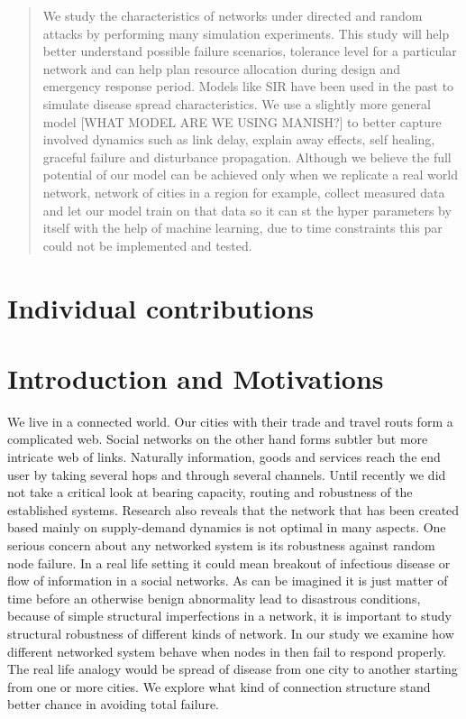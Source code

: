 \documentclass[11pt]{article}
\begin{document}

\tableofcontents

\newpage


\begin{abstract}
		We study the characteristics of networks under directed and random attacks by performing many simulation experiments. This study will help better understand possible failure scenarios, tolerance level for a particular network and can help plan resource allocation during design and emergency response period. Models like SIR have been used in the past to simulate disease spread characteristics. We use a slightly more general model [WHAT MODEL ARE WE USING MANISH?] to better capture involved dynamics such as link delay, explain away effects, self healing, graceful failure and disturbance propagation. Although we believe the full potential of our model can be achieved only when we replicate a real world network, network of cities in a region for example, collect measured data and let our model train on that data so it can st the hyper parameters by itself with the help of machine learning, due to time constraints this par could not be implemented and tested.
\end{abstract}
\clearpage

\section{Individual contributions}

\section{Introduction and Motivations}
   We live in a connected world. Our cities with their trade and travel routs form a complicated web. Social networks on the other hand forms subtler but more intricate web of links. Naturally information, goods and services reach the end user by taking several hops and through several channels. Until recently we did not take a critical look at bearing capacity, routing and robustness of the established systems. Research also reveals that the network that has been created based mainly on supply-demand dynamics is not optimal in many aspects. One serious concern about any networked system is its robustness against random node failure. In a real life setting it could mean breakout of infectious disease or flow of information in a social networks. As can be imagined it is just matter of time before an otherwise benign abnormality lead to disastrous conditions, because of simple structural imperfections in a network, it is important to study structural robustness of different kinds of network. In our study we examine how different networked system behave when nodes in then fail to respond properly. The real life analogy would be spread of disease from one city to another starting from one or more cities. We explore what kind of connection structure stand better chance in avoiding total failure.
\end{document}

